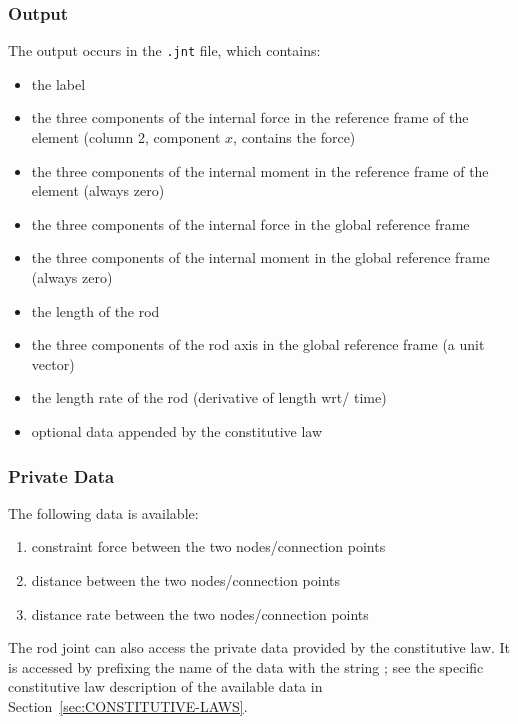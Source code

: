 \subsubsection{Output}
The output occurs in the \texttt{.jnt} file, which contains:
\begin{itemize}
\item the label
\item the three components of the internal force in the reference frame
of the element (column 2, component $x$, contains the force)
\item the three components of the internal moment in the reference frame
of the element (always zero)
\item the three components of the internal force in the global
reference frame
\item the three components of the internal moment in the global
reference frame (always zero)
\item the length of the rod
\item the three components of the rod axis in the global reference frame
(a unit vector)
\item the length rate of the rod (derivative of length wrt/ time)
\item optional data appended by the constitutive law
\end{itemize}

\subsubsection{Private Data}
The following data is available:
\begin{enumerate}
\item {} constraint force between the two nodes/connection points
\item {} distance between the two nodes/connection points
\item {} distance rate between the two nodes/connection points
\end{enumerate}
The rod joint can also access the private data provided 
by the constitutive law.
It is accessed by prefixing the name of the data with the string
; see the specific constitutive law
description of the available data in Section~\ref{sec:CONSTITUTIVE-LAWS}.





